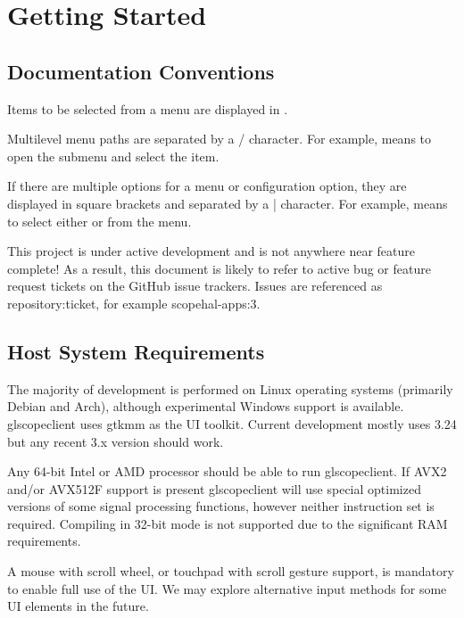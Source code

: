 \chapter{Getting Started}

\section{Documentation Conventions}

Items to be selected from a menu are displayed in .

Multilevel menu paths are separated by a / character. For example,  means to open the
 submenu and select the  item.

If there are multiple options for a menu or configuration option, they are displayed in square brackets and separated
by a | character. For example,  means to select either
 or  from the 
menu.

This project is under active development and is not anywhere near feature complete! As a result, this document is
likely to refer to active bug or feature request tickets on the GitHub issue trackers. Issues are referenced as
repository:ticket, for example scopehal-apps:3.

\section{Host System Requirements}

The majority of development is performed on Linux operating systems (primarily Debian and Arch), although experimental
Windows support is available. glscopeclient uses gtkmm as the UI toolkit. Current development mostly uses 3.24 but any
recent 3.x version should work.

Any 64-bit Intel or AMD processor should be able to run glscopeclient. If AVX2 and/or AVX512F support is present
glscopeclient will use special optimized versions of some signal processing functions, however neither instruction set
is required. Compiling in 32-bit mode is not supported due to the significant RAM requirements.

A mouse with scroll wheel, or touchpad with scroll gesture support, is mandatory to enable full use of the UI. We may
explore alternative input methods for some UI elements in the future.


